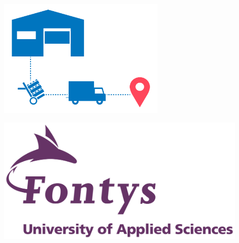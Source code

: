 \begin{titlepage}
    \begin{center}
        \vspace*{0.1cm}

        \Huge
        \textbf{\documentTitle}

        \vspace{0.3cm}
        \LARGE
        \documentSubtitle\\

        \vspace*{1.5cm}
        \includegraphics[width=0.6\textwidth]{images/distribution.png}

        \vspace*{3.5cm}
        \begin{minipage}{0.5\textwidth}
            \centering
        \end{minipage}%
        \begin{minipage}{0.5\textwidth}
            \centering
            \includegraphics[width=0.9\textwidth]{images/fontys_logo.png}
        \end{minipage}%
    \end{center}
    \vfill


\end{titlepage}
